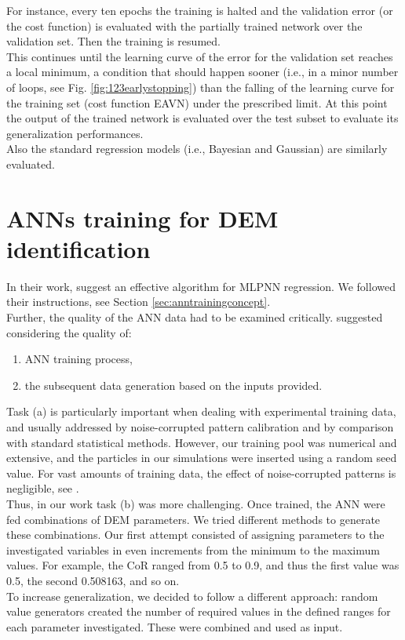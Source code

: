 For instance, every ten epochs the training is halted and the validation error
(or the cost function) is evaluated with the partially trained network over the
validation set.
Then the training is resumed. \\

This continues until the learning curve of the error for the validation set
reaches a local minimum, a condition that should happen sooner (i.e., in a
minor number of loops, see Fig. \ref{fig:123earlystopping}) than the falling of
the learning curve for the training set (cost function \acs{EAVN}) under the prescribed limit.
At this point the output of the trained network is evaluated over the test
subset to evaluate its generalization performances.\\
Also the standard regression models (i.e., Bayesian and Gaussian) are similarly
evaluated.

\section{ANNs training for DEM identification}
\label{sec:annstrainingfordemidentification}

In their work, \citet{RefWorks:150} suggest an effective algorithm for
\acs{MLPNN} regression. We followed their instructions, see Section
\ref{sec:anntrainingconcept}. \\
Further, the quality of the \acs{ANN} data had to be examined critically. 
\citet{RefWorks:158} 
suggested considering the quality of:
\begin{enumerate}[label=(\alph*)]
  \item {\acs{ANN} training process,}
  \item {the subsequent data generation based on the inputs provided.}
\end{enumerate}

Task (a) is particularly important
when dealing with experimental training data, and
usually addressed
by noise-corrupted pattern calibration
and by comparison with standard statistical methods.
However, our training pool was numerical and extensive, 
and the particles in our simulations were inserted using a random
seed value.
For vast amounts of training data, the effect of noise-corrupted patterns is
negligible, see \citet{RefWorks:158}. \\
Thus, in our work task (b) was more challenging.
Once trained, the \acs{ANN} were fed
combinations of \acs{DEM} parameters. 
We tried different methods to generate these combinations. 
Our first attempt consisted of assigning parameters to the investigated
variables in even increments from the minimum to the maximum values. 
For example, the \acs{CoR} ranged from 0.5 to 0.9, and thus the first value was
0.5, the second 0.508163, and so on. \\
To increase generalization, we decided to follow a different approach: 
random value generators created the number of required values in the defined
ranges for each parameter investigated.
These were combined and used as input.\\


